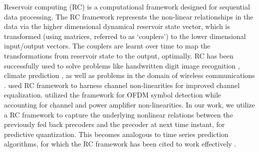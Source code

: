 \documentclass[conference]{IEEEtran}
\begin{document}
{
Reservoir computing (RC) is a computational framework designed for sequential data processing.
The RC framework represents the non-linear relationships in the data via the higher dimensional dynamical reservoir state vector, which is transformed (using matrices, referred to as `couplers') to the lower dimensional input/output vectors. The couplers are learnt over time to map the transformations from reservoir state to the output, optimally.
RC has been successfully used to solve problems like handwritten digit image recognition \cite{jalalvand2015real}, climate prediction \cite{pathak2017using}, as well as problems in the domain of wireless communications \cite{jaeger2004harnessing,mosleh2017brain,shafin2018realizing}.
\cite{jaeger2004harnessing} used RC framework to harness channel non-linearities for improved channel equalization.
\cite{mosleh2017brain,shafin2018realizing} utilized the framework for OFDM symbol detection while accounting for channel and power amplifier non-linearities.
In our work, we utilize a RC framework to capture the underlying nonlinear relations between the previously fed back precoders and the precoder at next time instant, for predictive quantization. This becomes analogous to time series prediction algorithms, for which the RC framework has been cited to work effectively \cite{mosleh2017brain}.

}
\end{document}
